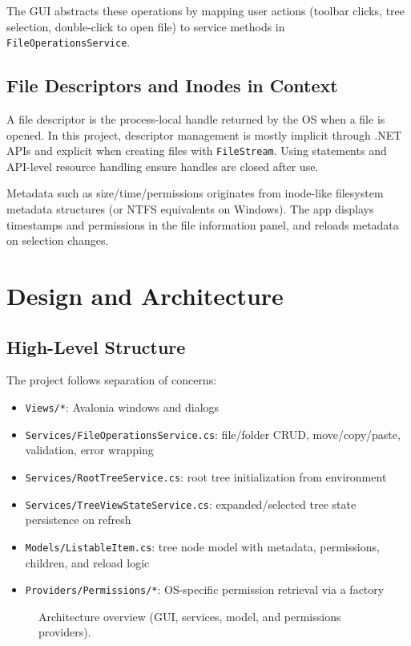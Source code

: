 \documentclass[11pt]{article}
\begin{document}
The GUI abstracts these operations by mapping user actions (toolbar clicks, tree selection, double-click to open file) to service methods in \texttt{FileOperationsService}.

\subsection*{File Descriptors and Inodes in Context}
A file descriptor is the process-local handle returned by the OS when a file is opened. In this project, descriptor management is mostly implicit through .NET APIs and explicit when creating files with \texttt{FileStream}. Using statements and API-level resource handling ensure handles are closed after use.

Metadata such as size/time/permissions originates from inode-like filesystem metadata structures (or NTFS equivalents on Windows). The app displays timestamps and permissions in the file information panel, and reloads metadata on selection changes.

\section{Design and Architecture}
\subsection*{High-Level Structure}
The project follows separation of concerns:
\begin{itemize}
  \item \texttt{Views/*}: Avalonia windows and dialogs
  \item \texttt{Services/FileOperationsService.cs}: file/folder CRUD, move/copy/paste, validation, error wrapping
  \item \texttt{Services/RootTreeService.cs}: root tree initialization from environment
  \item \texttt{Services/TreeViewStateService.cs}: expanded/selected tree state persistence on refresh
  \item \texttt{Models/ListableItem.cs}: tree node model with metadata, permissions, children, and reload logic
  \item \texttt{Providers/Permissions/*}: OS-specific permission retrieval via a factory
\end{itemize}

\begin{figure}[H]
\centering
{}
\caption{Architecture overview (GUI, services, model, and permissions providers).}
\end{figure}
\end{document}
